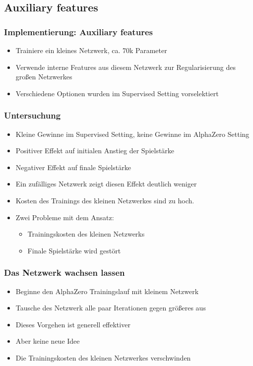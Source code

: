 \subsection{Auxiliary features}



\begin{frame}
 \frametitle{Implementierung: Auxiliary features}
  


\begin{itemize}
  \item \pause Trainiere ein kleines Netzwerk, ca. 70k Parameter
  \item \pause Verwende interne Features aus diesem Netzwerk zur Regularisierung des großen Netzwerkes
  \item \pause Verschiedene Optionen wurden im Supervised Setting vorselektiert
\end{itemize}

  
\end{frame}
\begin{frame}
 \frametitle{Untersuchung}
  


\begin{itemize}
  \item \pause Kleine Gewinne im Supervised Setting, keine Gewinne im AlphaZero Setting
  \item \pause Positiver Effekt auf initialen Anstieg der Spielstärke
  \item \pause Negativer Effekt auf finale Spielstärke
  \item \pause Ein zufälliges Netzwerk zeigt diesen Effekt deutlich weniger
  \item \pause Kosten des Trainings des kleinen Netzwerkes sind zu hoch.
  \item \pause Zwei Probleme mit dem Ansatz:
\begin{itemize}
  \item \pause Trainingskosten des kleinen Netzwerks
  \item \pause Finale Spielstärke wird gestört
\end{itemize}
\end{itemize}

  
\end{frame}
\begin{frame}
 \frametitle{Das Netzwerk wachsen lassen}
  


\begin{itemize}
  \item \pause Beginne den AlphaZero Trainingslauf mit kleinem Netzwerk
  \item \pause Tausche des Netzwerk alle paar Iterationen gegen größeres aus
  \item \pause Dieses Vorgehen ist generell effektiver
  \item \pause Aber keine neue Idee
  \item \pause Die Trainingskosten des kleinen Netzwerkes verschwinden
\end{itemize}

  
\end{frame}
